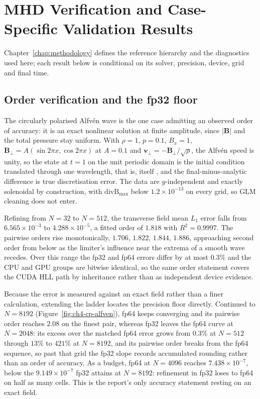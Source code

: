 
\chapter{MHD Verification and Case-Specific Validation Results}
\label{chap:mhd-validation-results}

Chapter~\ref{chap:methodology} defines the reference hierarchy and the
diagnostics used here; each result below is conditional on its solver,
precision, device, grid and final time.

\section{Order verification and the fp32 floor}
\label{sec:ch4-cp-alfven}

The circularly polarised Alfv\'en wave is the one case admitting an observed
order of accuracy: it is an exact nonlinear solution at finite amplitude, since
$|\mathbf B|$ and the total pressure stay uniform. With $\rho=1$, $p=0.1$,
$B_x=1$, $\mathbf B_\perp=A(\sin2\pi x,\cos2\pi x)$ at $A=0.1$ and
$\mathbf v_\perp=-\mathbf B_\perp/\sqrt{\rho}$, the Alfv\'en speed is unity, so
the state at $t=1$ on the unit periodic domain is the initial condition
translated through one wavelength, that is, itself
\citep{toth_2000,gardinerStone2005ct}, and the final-minus-analytic difference
is true discretisation error. The data are $y$-independent and exactly
solenoidal by construction, with $\mathrm{divB}_{\max}$ below
$1.2\times10^{-13}$ on every grid, so GLM cleaning does not enter.

Refining from $N=32$ to $N=512$, the transverse field mean $L_1$ error falls
from $6.565\times10^{-3}$ to $4.288\times10^{-5}$, a fitted order of $1.818$
with $R^2=0.9997$. The pairwise orders rise monotonically, $1.706$, $1.822$,
$1.844$, $1.886$, approaching second order from below as the limiter's
influence near the extrema of a smooth wave recedes. Over this range the fp32
and fp64 errors differ by at most $0.3\%$ and the CPU and GPU groups are
bitwise identical, so the same order statement covers the CUDA HLL path by
inheritance rather than as independent device evidence.

Because the error is measured against an exact field rather than a finer
calculation, extending the ladder locates the precision floor directly.
Continued to $N=8192$ (Figure~\ref{fig:ch4-cp-alfven}), fp64 keeps converging
and its pairwise order reaches $2.08$ on the finest pair, whereas fp32 leaves
the fp64 curve at $N=2048$: its excess over the matched fp64 error grows from
$0.3\%$ at $N=512$ through $13\%$ to $421\%$ at $N=8192$, and its pairwise order
breaks from the fp64 sequence, so past that grid the fp32 slope records
accumulated rounding rather than an order of accuracy. As a budget, fp64 at
$N=4096$ reaches $7.438\times10^{-7}$, below the $9.149\times10^{-7}$ fp32
attains at $N=8192$: refinement in fp32 loses to fp64 on half as many cells.
This is the report's only accuracy statement resting on an exact field.

